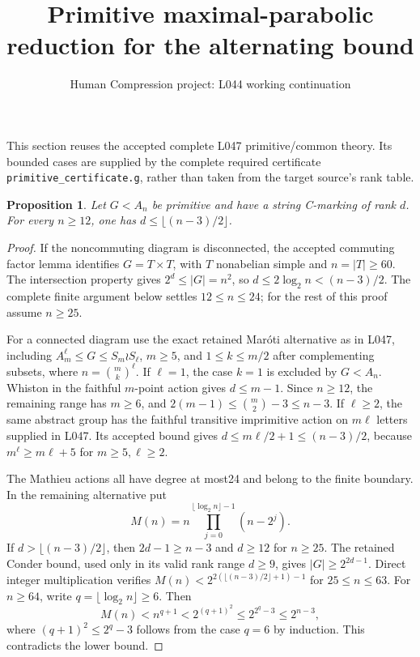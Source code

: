 \documentclass[11pt,a4paper]{article}
\title{Primitive maximal-parabolic reduction for the alternating bound}
\author{Human Compression project: L044 working continuation}
\date{}
\newtheorem{proposition}{Proposition}
\begin{document}
\maketitle
This section reuses the accepted complete L047 primitive/common
theory. Its bounded cases are supplied by the complete required certificate
\texttt{primitive\_certificate.g}, rather than taken from the target
source's rank table.

\begin{proposition}
Let $G<A_n$ be primitive and have a string C-marking of rank $d$.
For every $n\geq12$, one has $d\leq\lfloor(n-3)/2\rfloor$.
\end{proposition}
\begin{proof}
If the noncommuting diagram is disconnected, the accepted commuting
factor lemma identifies $G=T\times T$, with $T$ nonabelian simple
and $n=|T|\geq60$. The intersection property gives
$2^d\leq |G|=n^2$, so $d\leq2\log_2n<(n-3)/2$.
The complete finite argument below settles $12\leq n\leq24$;
for the rest of this proof assume $n\geq25$.

For a connected diagram use the exact retained Mar\'oti alternative
as in L047, including $A_m^\ell\leq G\leq S_m\wr S_\ell$,
$m\geq5$, and $1\leq k\leq m/2$ after complementing subsets,
where $n=\binom mk^\ell$. If $\ell=1$, the case $k=1$ is excluded
by $G<A_n$. Whiston in the faithful $m$-point action gives
$d\leq m-1$. Since $n\geq12$, the remaining range has $m\geq6$,
and $2(m-1)\leq\binom m2-3\leq n-3$.
If $\ell\geq2$, the same abstract group has the faithful transitive
imprimitive action on $m\ell$ letters supplied in L047. Its accepted
bound gives $d\leq m\ell/2+1\leq(n-3)/2$, because
$m^\ell\geq m\ell+5$ for $m\geq5,\ell\geq2$.

The Mathieu actions all have degree at most24 and belong to the
finite boundary. In the remaining alternative put
\[
 M(n)=n\prod_{j=0}^{\lfloor\log_2n\rfloor-1}(n-2^j).
\]
If $d>\lfloor(n-3)/2\rfloor$, then $2d-1\geq n-3$ and $d\geq12$
for $n\geq25$. The retained Conder bound, used only in its valid
rank range $d\geq9$, gives $|G|\geq2^{2d-1}$.
Direct integer multiplication verifies
$M(n)<2^{2(\lfloor(n-3)/2\rfloor+1)-1}$ for $25\leq n\leq63$.
For $n\geq64$, write $q=\lfloor\log_2n\rfloor\geq6$. Then
\[
 M(n)<n^{q+1}<2^{(q+1)^2}\leq2^{2^q-3}\leq2^{n-3},
\]
where $(q+1)^2\leq2^q-3$ follows from the case $q=6$ by induction.
This contradicts the lower bound.
\end{proof}
\end{document}
